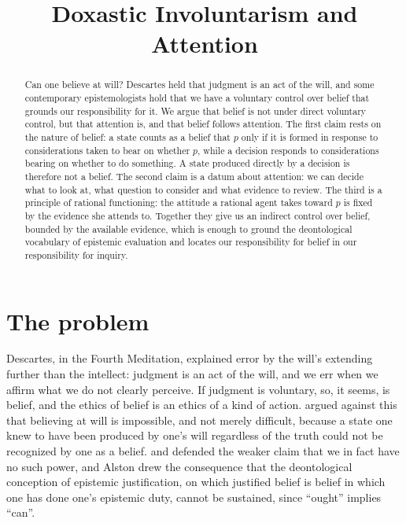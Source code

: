 \documentclass{situationist-preprint}
\title{Doxastic Involuntarism and Attention}
\begin{document}
\maketitle

\begin{abstract}
Can one believe at will? Descartes held that judgment is an act of the will, and some contemporary epistemologists hold that we have a voluntary control over belief that grounds our responsibility for it. We argue that belief is not under direct voluntary control, but that attention is, and that belief follows attention. The first claim rests on the nature of belief: a state counts as a belief that $p$ only if it is formed in response to considerations taken to bear on whether $p$, while a decision responds to considerations bearing on whether to do something. A state produced directly by a decision is therefore not a belief. The second claim is a datum about attention: we can decide what to look at, what question to consider and what evidence to review. The third is a principle of rational functioning: the attitude a rational agent takes toward $p$ is fixed by the evidence she attends to. Together they give us an indirect control over belief, bounded by the available evidence, which is enough to ground the deontological vocabulary of epistemic evaluation and locates our responsibility for belief in our responsibility for inquiry.
\end{abstract}

\section{The problem}

Descartes, in the Fourth Meditation, explained error by the will's extending further than the intellect: judgment is an act of the will, and we err when we affirm what we do not clearly perceive. If judgment is voluntary, so, it seems, is belief, and the ethics of belief is an ethics of a kind of action. \citet{Williams1973} argued against this that believing at will is impossible, and not merely difficult, because a state one knew to have been produced by one's will regardless of the truth could not be recognized by one as a belief. \citet{Bennett1990} and \citet{Alston1988} defended the weaker claim that we in fact have no such power, and Alston drew the consequence that the deontological conception of epistemic justification, on which justified belief is belief in which one has done one's epistemic duty, cannot be sustained, since \enquote{ought} implies \enquote{can}.
\end{document}
